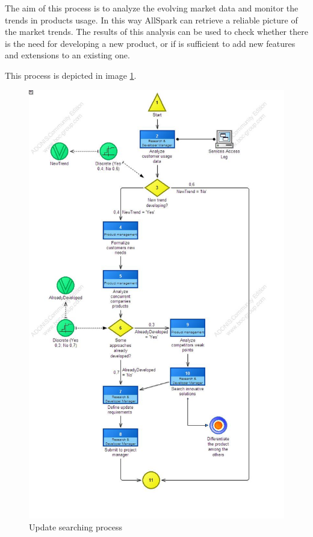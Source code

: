 The aim of this process is to analyze the evolving market data and monitor
the trends in products usage. In this way AllSpark can retrieve a reliable
picture of the market trends.
The results of this analysis can be used to check whether there is the need
for developing a new product, or if is sufficient to add new features and
extensions to an existing one.

This process is depicted in image \ref{2img:search_upd}.

\begin{figure}[!ht]
\begin{centering}
\includegraphics[scale=0.50]{assign2/adonis/imgs/search_upd.jpg}
\caption{Update searching process}
\label{2img:search_upd}
\end{centering}
\end{figure}

